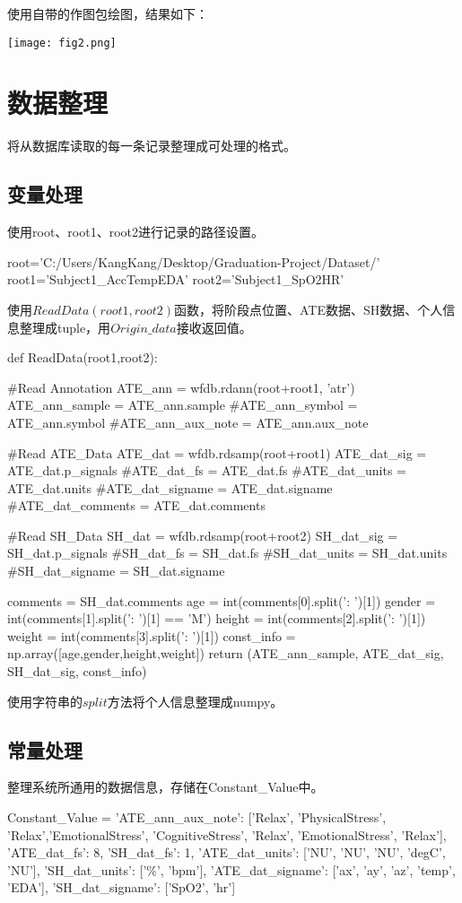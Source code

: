 \documentclass[UTF8]{ctexart}
\begin{document}
使用自带的作图包绘图，结果如下：
\begin{center} 
\texttt{[image: fig2.png]}\\
\end{center}
\section{数据整理}
\date{2017.12.2}

将从数据库读取的每一条记录整理成可处理的格式。
\subsection{变量处理}
使用root、root1、root2进行记录的路径设置。
\begin{python}
root='C:/Users/KangKang/Desktop/Graduation-Project/Dataset/'
root1='Subject1_AccTempEDA'
root2='Subject1_SpO2HR'
\end{python}
使用$ReadData(root1,root2)$函数，将阶段点位置、ATE数据、SH数据、个人信息整理成tuple，用$Origin\_data$接收返回值。
\begin{python}
def ReadData(root1,root2):
    
    #Read Annotation
    ATE_ann = wfdb.rdann(root+root1, 'atr')
    ATE_ann_sample = ATE_ann.sample
    #ATE_ann_symbol = ATE_ann.symbol
    #ATE_ann_aux_note = ATE_ann.aux_note

    #Read ATE_Data
    ATE_dat = wfdb.rdsamp(root+root1)
    ATE_dat_sig = ATE_dat.p_signals
    #ATE_dat_fs = ATE_dat.fs
    #ATE_dat_units = ATE_dat.units
    #ATE_dat_signame = ATE_dat.signame
    #ATE_dat_comments = ATE_dat.comments

    #Read SH_Data
    SH_dat = wfdb.rdsamp(root+root2)
    SH_dat_sig = SH_dat.p_signals
    #SH_dat_fs = SH_dat.fs
    #SH_dat_units = SH_dat.units
    #SH_dat_signame = SH_dat.signame
    
    comments = SH_dat.comments
    age = int(comments[0].split(': ')[1])
    gender = int(comments[1].split(': ')[1] == 'M')
    height = int(comments[2].split(': ')[1])
    weight = int(comments[3].split(': ')[1])
    const_info = np.array([age,gender,height,weight])
    return (ATE_ann_sample, ATE_dat_sig, SH_dat_sig, const_info)
\end{python}
使用字符串的$split$方法将个人信息整理成numpy。
\subsection{常量处理}
整理系统所通用的数据信息，存储在Constant\_Value中。
\begin{python}
Constant_Value = {
       'ATE_ann_aux_note': ['Relax', 'PhysicalStress', 'Relax','EmotionalStress', 
                'CognitiveStress', 'Relax', 'EmotionalStress', 'Relax'],
        'ATE_dat_fs': 8,  
         'SH_dat_fs': 1,       
        'ATE_dat_units': ['NU', 'NU', 'NU', 'degC', 'NU'],
         'SH_dat_units': ['\%', 'bpm'],
        'ATE_dat_signame': ['ax', 'ay', 'az', 'temp', 'EDA'],
         'SH_dat_signame': ['SpO2', 'hr']
         }
\end{python}
\end{document}
